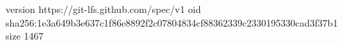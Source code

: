 version https://git-lfs.github.com/spec/v1
oid sha256:1e3a649b3e637c1f86e8892f2c07804834cf88362339c2330195330cad3f37b1
size 1467
